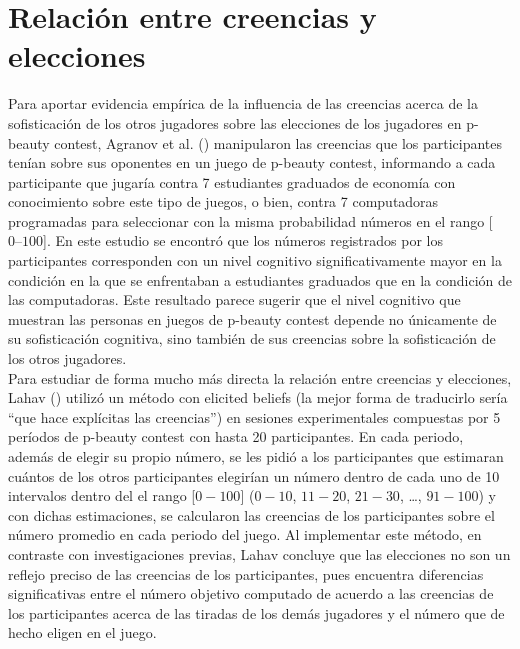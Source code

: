 \section{Relación entre creencias y elecciones}

Para aportar evidencia empírica de la influencia de las creencias acerca de la sofisticación de los otros jugadores sobre las elecciones de los jugadores en p-beauty contest, Agranov et al. (\citeyear{Agranov}) manipularon las creencias que los participantes tenían sobre sus oponentes en un juego de p-beauty contest, informando a cada participante que jugaría contra 7 estudiantes graduados de economía con conocimiento sobre este tipo de juegos, o bien, contra 7 computadoras programadas para seleccionar con la misma probabilidad  números en el rango [$0 – 100$]. En este estudio se encontró que los números registrados por los participantes corresponden con un nivel cognitivo significativamente mayor en la condición en la que se enfrentaban a estudiantes graduados que en la condición de las computadoras. Este resultado parece sugerir que el nivel cognitivo que muestran las personas en juegos de p-beauty contest depende no únicamente de su sofisticación cognitiva, sino también de sus creencias sobre la sofisticación de los otros jugadores.\\

Para estudiar de forma mucho más directa la relación entre creencias y elecciones, Lahav (\citeyear{Lahav}) utilizó un método con elicited beliefs (la mejor forma de traducirlo sería “que hace explícitas las creencias”) en sesiones experimentales compuestas por 5 períodos de p-beauty contest con hasta 20 participantes. En cada periodo, además de elegir su propio número, se les pidió a los participantes que estimaran cuántos de los otros participantes elegirían un número dentro de cada uno de 10 intervalos dentro del el rango [$0-100$] ($0-10$, $11-20$, $21-30$, …, $91-100$) y con dichas estimaciones, se calcularon las creencias de los participantes sobre el número promedio en cada periodo del juego. Al implementar este método, en contraste con investigaciones previas, Lahav concluye que las elecciones no son un reflejo preciso de las creencias de los participantes, pues encuentra diferencias significativas entre el número objetivo computado de acuerdo a las creencias de los participantes acerca de las tiradas de los demás jugadores y el número que de hecho eligen en el juego.\\

